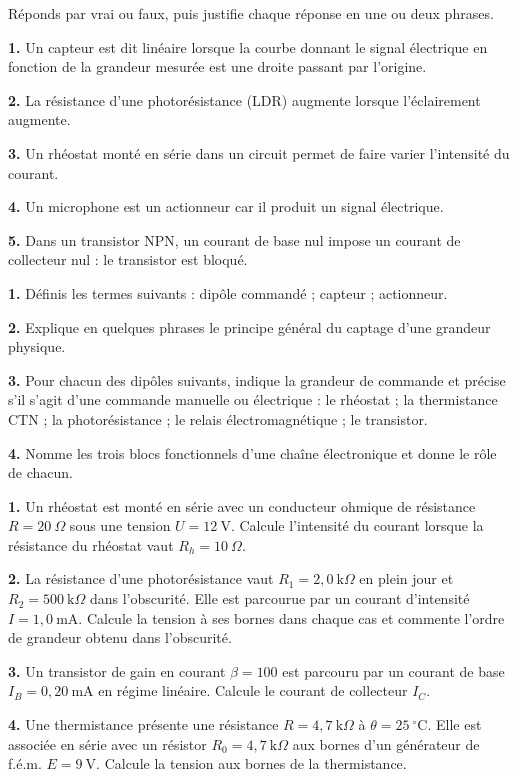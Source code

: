 \documentclass[11pt]{article}
\newcommand{\cle}[1]{{\popxbold\color{popdark}#1}}
\begin{document}
\begin{exercice}
Réponds par vrai ou faux, puis justifie chaque réponse en une ou deux phrases.

\textbf{1.} Un capteur est dit linéaire lorsque la courbe donnant le signal électrique en fonction de la grandeur mesurée est une droite passant par l'origine.

\textbf{2.} La résistance d'une photorésistance (LDR) augmente lorsque l'éclairement augmente.

\textbf{3.} Un rhéostat monté en série dans un circuit permet de faire varier l'intensité du courant.

\textbf{4.} Un microphone est un actionneur car il produit un signal électrique.

\textbf{5.} Dans un transistor NPN, un courant de base nul impose un courant de collecteur nul : le transistor est bloqué.
\end{exercice}

\begin{exercice}
\textbf{1.} Définis les termes suivants : \cle{dipôle commandé} ; \cle{capteur} ; \cle{actionneur}.

\textbf{2.} Explique en quelques phrases le principe général du captage d'une grandeur physique.

\textbf{3.} Pour chacun des dipôles suivants, indique la grandeur de commande et précise s'il s'agit d'une commande manuelle ou électrique : le rhéostat ; la thermistance CTN ; la photorésistance ; le relais électromagnétique ; le transistor.

\textbf{4.} Nomme les trois blocs fonctionnels d'une chaîne électronique et donne le rôle de chacun.
\end{exercice}

\begin{exercice}
\textbf{1.} Un rhéostat est monté en série avec un conducteur ohmique de résistance $R = 20~\Omega$ sous une tension $U = 12~\text{V}$. Calcule l'intensité du courant lorsque la résistance du rhéostat vaut $R_h = 10~\Omega$.

\textbf{2.} La résistance d'une photorésistance vaut $R_1 = 2{,}0~\text{k}\Omega$ en plein jour et $R_2 = 500~\text{k}\Omega$ dans l'obscurité. Elle est parcourue par un courant d'intensité $I = 1{,}0~\text{mA}$. Calcule la tension à ses bornes dans chaque cas et commente l'ordre de grandeur obtenu dans l'obscurité.

\textbf{3.} Un transistor de gain en courant $\beta = 100$ est parcouru par un courant de base $I_B = 0{,}20~\text{mA}$ en régime linéaire. Calcule le courant de collecteur $I_C$.

\textbf{4.} Une thermistance présente une résistance $R = 4{,}7~\text{k}\Omega$ à $\theta = 25~^\circ\text{C}$. Elle est associée en série avec un résistor $R_0 = 4{,}7~\text{k}\Omega$ aux bornes d'un générateur de f.é.m. $E = 9~\text{V}$. Calcule la tension aux bornes de la thermistance.
\end{exercice}
\end{document}
